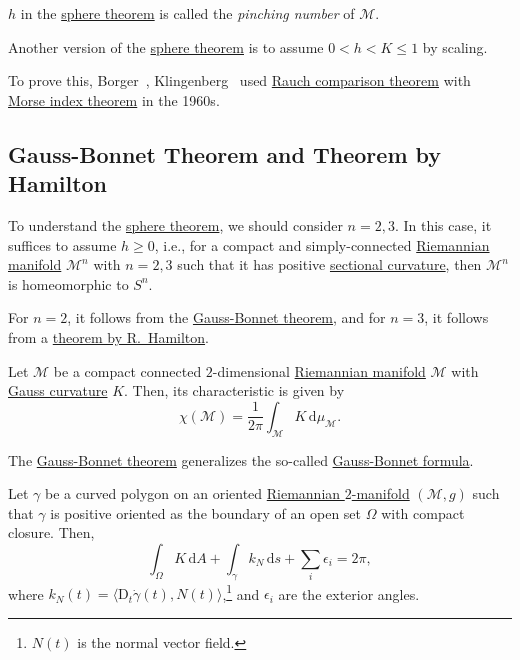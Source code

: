 \begin{notation}
	\(h\) in the \hyperref[thm:sphere]{sphere theorem} is called the \emph{pinching number} of \(\mathcal{M} \).
\end{notation}

\begin{remark}\label{rmk:sphere-theorem-scaling}
	Another version of the \hyperref[thm:sphere]{sphere theorem} is to assume \(0 < h < K \leq 1\) by scaling.
\end{remark}

To prove this, Borger~\cite{berger1960varietes}, Klingenberg~\cite{Klingenberg1961} used \hyperref[thm:Rauch-comparison]{Rauch comparison theorem} with \hyperref[thm:Morse-index]{Morse index theorem} in the 1960s.

\subsection{Gauss-Bonnet Theorem and Theorem by Hamilton}
To understand the  \hyperref[thm:sphere]{sphere theorem}, we should consider \(n = 2, 3\). In this case, it suffices to assume \(h \geq 0\), i.e., for a compact and simply-connected \hyperref[def:Riemannian-manifold]{Riemannian manifold} \(\mathcal{M} ^n \) with \(n = 2, 3\) such that it has positive \hyperref[def:sectional-curvature]{sectional curvature}, then \(\mathcal{M} ^n\) is homeomorphic to \(S^n\).

\begin{note}
	For \(n = 2\), it follows from the \hyperref[thm:Gauss-Bonnet]{Gauss-Bonnet theorem}, and for \(n = 3\), it follows from a \hyperref[thm:Hamilton]{theorem by R.\ Hamilton}.
\end{note}

\begin{theorem}\label{thm:Gauss-Bonnet}
	Let \(\mathcal{M} \) be a compact connected \(2\)-dimensional \hyperref[def:Riemannian-manifold]{Riemannian manifold} \(\mathcal{M} \) with \hyperref[rmk:Gauss-curvature]{Gauss curvature} \(K\). Then, its characteristic is given by
	\[
		\chi (\mathcal{M} ) = \frac{1}{2\pi } \int _\mathcal{M} K \,\mathrm{d} \mu _{\mathcal{M} }.
	\]
\end{theorem}

The \hyperref[thm:Gauss-Bonnet]{Gauss-Bonnet theorem} generalizes the so-called \hyperref[note:Gauss-Bonnet-formula]{Gauss-Bonnet formula}.

\begin{note}\label{note:Gauss-Bonnet-formula}
	Let \(\gamma \) be a curved polygon on an oriented \hyperref[def:Riemannian-manifold]{Riemannian \(2\)-manifold} \((\mathcal{M} , g)\) such that \(\gamma \) is positive oriented as the boundary of an open set \(\Omega \) with compact closure. Then,
	\[
		\int _\Omega K \,\mathrm{d} A + \int _{\gamma } k_N\,\mathrm{d} s + \sum_{i} \epsilon _i = 2\pi ,
	\]
	where \(k_N(t) = \langle \mathrm{D} _t \dot{\gamma }(t), N(t)  \rangle \),\footnote{\(N(t)\) is the normal vector field.} and \(\epsilon _i\) are the exterior angles.
\end{note}

